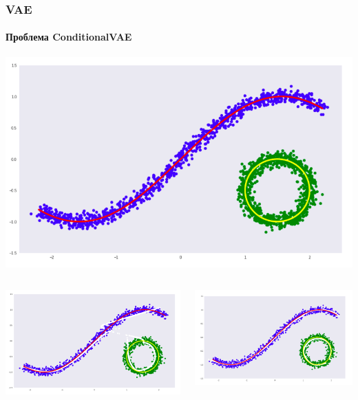 \documentclass[10pt]{beamer}
\begin{document}
\begin{frame}
\frametitle{VAE}
\framesubtitle{Проблема ConditionalVAE}

\includegraphics[width=1\textwidth]{images/cvae_problem1.png}

\begin{columns}
    \begin{column}{0.5\textwidth}
        \begin{center}
            \includegraphics[width=1\textwidth]{images/cvae_problem2.png}
        \end{center}
    \end{column}
    \begin{column}{0.5\textwidth}
        \begin{center}
            \includegraphics[width=1\textwidth]{images/cvae_problem3.png}
        \end{center}
    \end{column}
\end{columns}


\end{frame}
\end{document}
